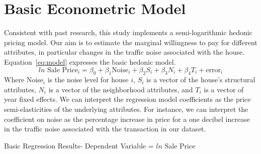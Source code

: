 \documentclass{article}\usepackage{graphicx, color}
\begin{document}
\section{Basic Econometric Model}\label{basicModel}
Consistent with past research, this study implements a semi-logarithmic hedonic pricing model. Our aim is to estimate the marginal willingness to pay for different attributes, in particular changes in the traffic noise associated with the house. Equation~\eqref{eq:model} expresses the basic hedonic model.
\begin{equation}\label{eq:model}	
ln \textrm{ Sale Price}_i = \beta _0 + \beta _1 \textrm{Noise}_i+ \beta _2 S_i+ \beta _3 N_i + \beta _4 T_i + \textrm{error}_i
\end{equation}
Where Noise$_i$ is the noise level for house $i$, $S_i$ is a vector of the house's structural attributes, $N_i$ is a vector of the neighborhood attributes, and $T_i$ is a vector of year fixed effects. We can interpret the regression model coefficients as the price semi-elasticities of the underlying attributes. For instance, we can interpret the coefficient on noise as the percentage increase in price for a one decibel increase in the traffic noise associated with the transaction in our dataset. 

\begin{table}
\caption{Basic Regression Results- Dependent Variable = $ln$ Sale Price}\label{tab:globalRegression}

\end{table}
\end{document}
